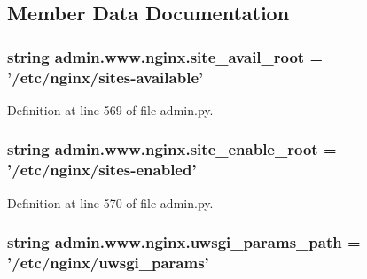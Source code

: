 \subsection{Member Data Documentation}
\hypertarget{classadmin_1_1www_1_1nginx_a0345aad76d9ddd6469c13bef207a9766}{
\subsubsection[{site\-\_\-avail\-\_\-root}]{\setlength{\rightskip}{0pt plus 5cm}string admin.\-www.\-nginx.\-site\-\_\-avail\-\_\-root = '/etc/{\bf nginx}/sites-\/available'\hspace{0.3cm}{\ttfamily [static]}}}\label{classadmin_1_1www_1_1nginx_a0345aad76d9ddd6469c13bef207a9766}


Definition at line 569 of file admin.\-py.

\hypertarget{classadmin_1_1www_1_1nginx_a3e1b0fbd45f31aaeacb6baaec80806ce}{
\subsubsection[{site\-\_\-enable\-\_\-root}]{\setlength{\rightskip}{0pt plus 5cm}string admin.\-www.\-nginx.\-site\-\_\-enable\-\_\-root = '/etc/{\bf nginx}/sites-\/enabled'\hspace{0.3cm}{\ttfamily [static]}}}\label{classadmin_1_1www_1_1nginx_a3e1b0fbd45f31aaeacb6baaec80806ce}


Definition at line 570 of file admin.\-py.

\hypertarget{classadmin_1_1www_1_1nginx_afd444548cd6faf42c56e24e22148a4b4}{
\subsubsection[{uwsgi\-\_\-params\-\_\-path}]{\setlength{\rightskip}{0pt plus 5cm}string admin.\-www.\-nginx.\-uwsgi\-\_\-params\-\_\-path = '/etc/{\bf nginx}/uwsgi\-\_\-params'\hspace{0.3cm}{\ttfamily [static]}}}\label{classadmin_1_1www_1_1nginx_afd444548cd6faf42c56e24e22148a4b4}


